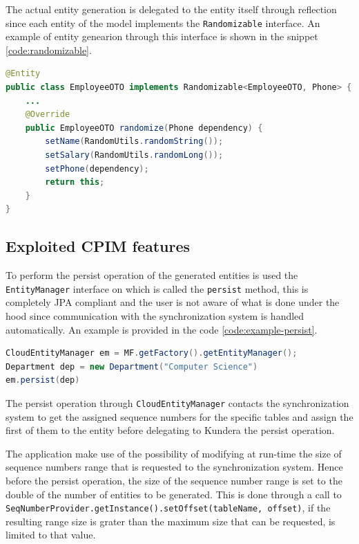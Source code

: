 \noindent The actual entity generation is delegated to the entity itself through reflection since each entity of the model implements the \texttt{Randomizable} interface.
An example of entity genearion through this interface is shown in the snippet \ref{code:randomizable}.

\begin{lstlisting}[language=Java, caption=Entities generation, label=code:randomizable]
@Entity
public class EmployeeOTO implements Randomizable<EmployeeOTO, Phone> {
    ...
    @Override
    public EmployeeOTO randomize(Phone dependency) {
        setName(RandomUtils.randomString());
        setSalary(RandomUtils.randomLong());
        setPhone(dependency);
        return this;
    }
}
\end{lstlisting}
 
\subsection{Exploited CPIM features}
To perform the persist operation of the generated entities is used the \texttt{EntityManager} interface on which is called the \texttt{persist} method, this is completely JPA compliant and the user is not aware of what is done under the hood since communication with the synchronization system is handled automatically. An example is provided in the code \ref{code:example-persist}.

\begin{lstlisting}[language=Java, caption=Persisting entities in CPIM, label=code:example-persist]
CloudEntityManager em = MF.getFactory().getEntityManager();
Department dep = new Department("Computer Science")
em.persist(dep)
\end{lstlisting}

\noindent The persist operation through \texttt{CloudEntityManager} contacts the synchronization system to get the assigned sequence numbers for the specific tables and assign the first of them to the entity before delegating to Kundera the persist operation.

\newparagraph The application make use of the possibility of modifying at run-time the size of sequence numbers range that is requested to the synchronization system. Hence before the persist operation, the size of the sequence number range is set to the double of the number of entities to be generated. This is done through a call to \texttt{SeqNumberProvider.getInstance().setOffset(tableName, offset)}, if the resulting range size is grater than the maximum size that can be requested, is limited to that value. 

